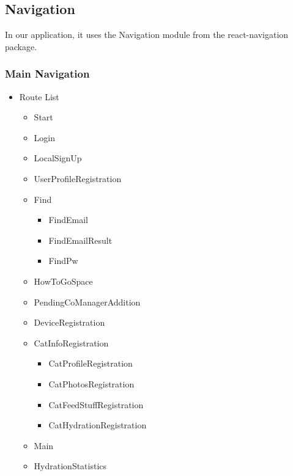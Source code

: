 \documentclass[conference]{IEEEtran}
\begin{document}
\subsection{Navigation}
In our application, it uses the Navigation module from the react-navigation package. \\

\subsubsection{Main Navigation}
\begin{itemize}
    \item Route List
    \begin{itemize}
        \item Start
        \item Login
        \item LocalSignUp
        \item UserProfileRegistration
        \item Find
        \begin{itemize}
            \item FindEmail
            \item FindEmailResult
            \item FindPw
        \end{itemize}
        \item HowToGoSpace
        \item PendingCoManagerAddition
        \item DeviceRegistration
        \item CatInfoRegistration
        \begin{itemize}
            \item CatProfileRegistration
            \item CatPhotosRegistration
            \item CatFeedStuffRegistration
            \item CatHydrationRegistration
        \end{itemize}
        \item Main
        \item HydrationStatistics \\
    \end{itemize}
\end{itemize}
\end{document}
